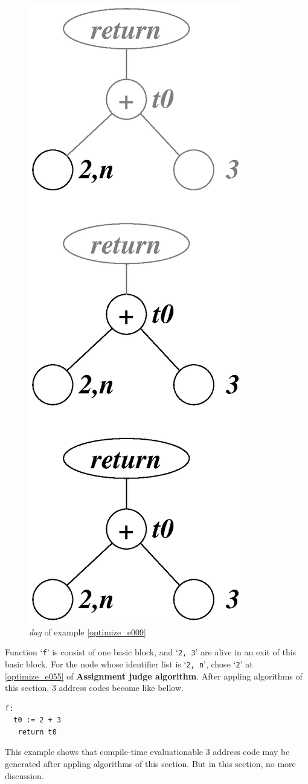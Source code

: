 \begin{Example}
\begin{figure}[htbp]
\begin{center}
\begin{latexonly}
\includegraphics[width=0.392\linewidth,height=1.0\linewidth]{opt002.eps}
\end{latexonly}
\caption{{\em dag} of example \ref{optimize_e009}}
\label{optimize_e010}
\end{center}
\end{figure}
Function `{\tt{f}}' is consist of one basic block, and 
`{\tt{2, 3}}' are alive in an exit of this basic block.
For the node whose identifier list is `{\tt{2, n}}',
chose `{\tt{2}}' at \ref{optimize_e055} of {\bf Assignment judge algorithm}.
After appling algorithms of this section,
3 address codes become like bellow.
\begin{verbatim}
f:
  t0 := 2 + 3
   return t0
\end{verbatim}
This example shows that
compile-time evaluationable 3 address code may be generated
after appling algorithms of this section. But in this section,
no more discussion.
\end{Example}

